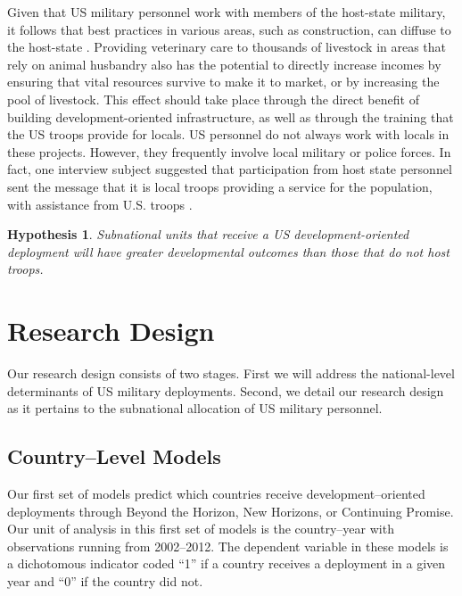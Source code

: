 \documentclass[12pt]{article}
\newtheorem{hyp}{Hypothesis}
\begin{document}
\begin{doublespace}
Given that US military personnel work with members of the host-state military, it follows that best practices in various areas, such as construction, can diffuse to the host-state \cite{SFC20160226}. Providing veterinary care to thousands of livestock in areas that rely on animal husbandry also has the potential to directly increase incomes by ensuring that vital resources survive to make it to market, or by increasing the pool of livestock. This effect should take place through the direct benefit of building development-oriented infrastructure, as well as through the training that the US troops provide for locals.  US personnel do not always work with locals in these projects. However, they frequently involve local military or police forces.  In fact, one interview subject suggested that participation from host state personnel sent the message that it is local troops providing a service for the population, with assistance from U.S. troops \cite{CPT20160309}.

\begin{hyp}
Subnational units that receive a US development-oriented deployment will have greater developmental outcomes than those that do not host troops.
\end{hyp}

% 


\section{Research Design}

Our research design consists of two stages. First we will address the national-level determinants of US military deployments. Second, we detail our research design as it pertains to the subnational allocation of US military personnel. 

\subsection{Country--Level Models}
Our first set of models predict which countries receive development--oriented deployments through Beyond the Horizon, New Horizons, or Continuing Promise. Our unit of analysis in this first set of models is the country--year with observations running from 2002--2012. The dependent variable in these models is a dichotomous indicator coded ``1'' if a country receives a deployment in a given year and ``0'' if the country did not. 


\end{doublespace}
\end{document}
